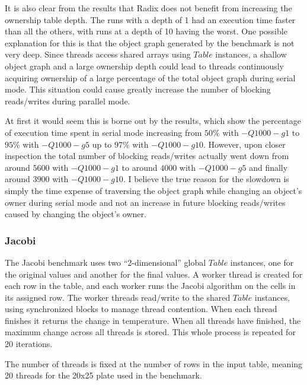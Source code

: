 It is also clear from the results that Radix does not benefit from
increasing the ownership table depth.  The runs with a depth of 1 had
an execution time faster than all the others, with runs at a depth of
10 having the worst.  One possible explanation for this is that the
object graph generated by the benchmark is not very deep.  Since
threads access shared arrays using $Table$ instances, a shallow object
graph and a large ownership depth could lead to threads continuously
acquiring ownership of a large percentage of the total object graph
during serial mode.  This situation could cause greatly increase the
number of blocking reads/writes during parallel mode.

At first it would seem this is borne out by the results, which show
the percentage of execution time spent in serial mode increasing from
$50\%$ with $-Q1000 -g1$ to $95\%$ with $-Q1000 -g5$ up to $97\%$ with
$-Q1000 -g10$.  However, upon closer inspection the total number of
blocking reads/writes actually went down from around $5600$ with
$-Q1000 -g1$ to around $4000$ with $-Q1000 -g5$ and finally around
$3900$ with $-Q1000 -g10$.  I believe the true reason for the slowdown
is simply the time expense of traversing the object graph while
changing an object's owner during serial mode and not an increase in
future blocking reads/writes caused by changing the object's owner.

\subsubsection{Jacobi}

The Jacobi benchmark uses two ``2-dimensional'' global $Table$
instances, one for the original values and another for the final
values.  A worker thread is created for each row in the table, and
each worker runs the Jacobi algorithm on the cells in its assigned
row.  The worker threads read/write to the shared $Table$ instances,
using synchronized blocks to manage thread contention.  When each
thread finishes it returns the change in temperature.  When all
threads have finished, the maximum change across all threads is
stored.  This whole process is repeated for 20 iterations.

The number of threads is fixed at the number of rows in the input
table, meaning 20 threads for the 20x25 plate used in the benchmark.

